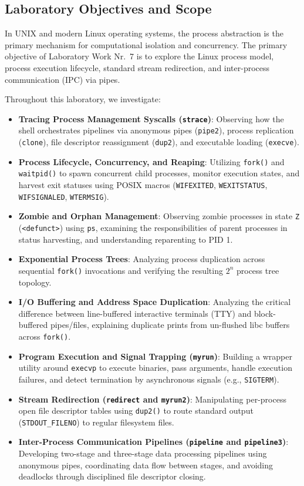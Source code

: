 \documentclass[12pt,a4paper]{article}
\begin{document}
\subsection{Laboratory Objectives and Scope}
In UNIX and modern Linux operating systems, the process abstraction is the primary mechanism for computational isolation and concurrency. The primary objective of Laboratory Work Nr.~7 is to explore the Linux process model, process execution lifecycle, standard stream redirection, and inter-process communication (IPC) via pipes.

Throughout this laboratory, we investigate:
\begin{itemize}
    \item \textbf{Tracing Process Management Syscalls (\texttt{strace})}: Observing how the shell orchestrates pipelines via anonymous pipes (\texttt{pipe2}), process replication (\texttt{clone}), file descriptor reassignment (\texttt{dup2}), and executable loading (\texttt{execve}).
    \item \textbf{Process Lifecycle, Concurrency, and Reaping}: Utilizing \texttt{fork()} and \texttt{waitpid()} to spawn concurrent child processes, monitor execution states, and harvest exit statuses using POSIX macros (\texttt{WIFEXITED}, \texttt{WEXITSTATUS}, \texttt{WIFSIGNALED}, \texttt{WTERMSIG}).
    \item \textbf{Zombie and Orphan Management}: Observing zombie processes in state \texttt{Z} (\texttt{<defunct>}) using \texttt{ps}, examining the responsibilities of parent processes in status harvesting, and understanding reparenting to PID 1.
    \item \textbf{Exponential Process Trees}: Analyzing process duplication across sequential \texttt{fork()} invocations and verifying the resulting $2^n$ process tree topology.
    \item \textbf{I/O Buffering and Address Space Duplication}: Analyzing the critical difference between line-buffered interactive terminals (TTY) and block-buffered pipes/files, explaining duplicate prints from un-flushed libc buffers across \texttt{fork()}.
    \item \textbf{Program Execution and Signal Trapping (\texttt{myrun})}: Building a wrapper utility around \texttt{execvp} to execute binaries, pass arguments, handle execution failures, and detect termination by asynchronous signals (e.g., \texttt{SIGTERM}).
    \item \textbf{Stream Redirection (\texttt{redirect} and \texttt{myrun2})}: Manipulating per-process open file descriptor tables using \texttt{dup2()} to route standard output (\texttt{STDOUT\_FILENO}) to regular filesystem files.
    \item \textbf{Inter-Process Communication Pipelines (\texttt{pipeline} and \texttt{pipeline3})}: Developing two-stage and three-stage data processing pipelines using anonymous pipes, coordinating data flow between stages, and avoiding deadlocks through disciplined file descriptor closing.
\end{itemize}
\end{document}
